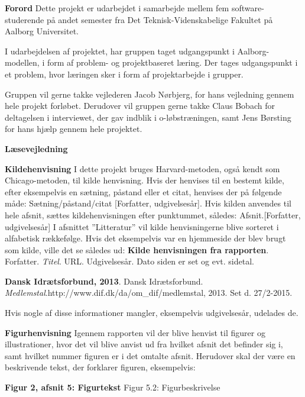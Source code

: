 {\Huge\textbf{Forord}}
Dette projekt er udarbejdet i samarbejde mellem fem software-studerende på andet semester fra Det Teknisk-Videnskabelige Fakultet på Aalborg Universitet. 

I udarbejdelsen af projektet, har gruppen taget udgangspunkt i Aalborg-modellen, i form af problem- og projektbaseret læring. Der tages udgangspunkt i et problem, hvor læringen sker i form af projektarbejde i grupper.

Gruppen vil gerne takke vejlederen Jacob Nørbjerg, for hans vejledning gennem hele projekt forløbet. Derudover vil gruppen gerne takke Claus Bobach for deltagelsen i interviewet, der gav indblik i o-løbstræningen, samt Jens Børsting for hans hjælp gennem hele projektet.

{\Huge\textbf{Læsevejledning}}

{\Large\textbf{Kildehenvisning}}\newline
I dette projekt bruges Harvard-metoden, også kendt som Chicago-metoden, til kilde henvisning. Hvis der henvises til en bestemt kilde, efter eksempelvis en sætning, påstand eller et citat, henvises der på følgende måde: Sætning/påstand/citat [Forfatter, udgivelsesår].\newline
Hvis kilden anvendes til hele afsnit, sættes kildehenvisningen efter punktummet, således: Afsnit.[Forfatter, udgivelsesår]\newline
I afsnittet ”Litteratur” vil kilde henvisningerne blive sorteret i alfabetisk rækkefølge. Hvis det eksempelvis var en hjemmeside der blev brugt som kilde, ville det se således ud: \newline
\textbf{Kilde henvisningen fra rapporten}. Forfatter. \textit{Titel}. URL. Udgivelsesår. Dato siden er set og evt. sidetal.

\textbf{Dansk Idrætsforbund, 2013}. Dansk Idrætsforbund. \textit{Medlemstal}.\newline http://www.dif.dk/da/om\_dif/medlemstal, 2013. Set d. 27/2-2015.

Hvis nogle af disse informationer mangler, eksempelvis udgivelsesår, udelades de.

{\Large\textbf{Figurhenvisning}} \newline
Igennem rapporten vil der blive henvist til figurer og illustrationer, hvor det vil blive anvist ud fra hvilket afsnit det befinder sig i, samt hvilket nummer figuren er i det omtalte afsnit. Herudover skal der være en beskrivende tekst, der forklarer figuren, eksempelvis:
\begin{flushleft}
	{\LARGE\textbf{Figur 2, afsnit 5: Figurtekst}}\newline
	Figur 5.2: Figurbeskrivelse
\end{flushleft}
